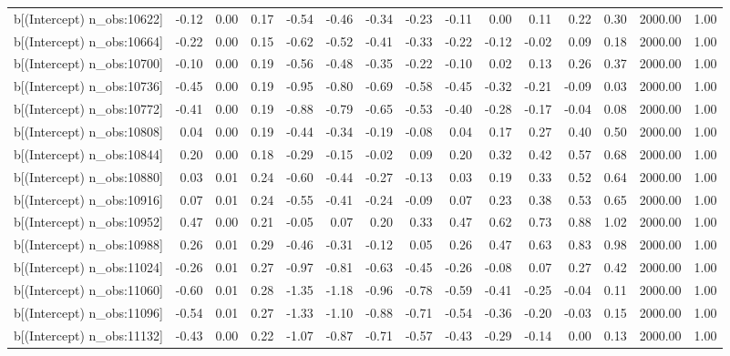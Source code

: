 \begin{table}[ht]
\begin{tabular}{rrrrrrrrrrrrrrr}
  b[(Intercept) n\_obs:10622] & -0.12 & 0.00 & 0.17 & -0.54 & -0.46 & -0.34 & -0.23 & -0.11 & 0.00 & 0.11 & 0.22 & 0.30 & 2000.00 & 1.00 \\ 
  b[(Intercept) n\_obs:10664] & -0.22 & 0.00 & 0.15 & -0.62 & -0.52 & -0.41 & -0.33 & -0.22 & -0.12 & -0.02 & 0.09 & 0.18 & 2000.00 & 1.00 \\ 
  b[(Intercept) n\_obs:10700] & -0.10 & 0.00 & 0.19 & -0.56 & -0.48 & -0.35 & -0.22 & -0.10 & 0.02 & 0.13 & 0.26 & 0.37 & 2000.00 & 1.00 \\ 
  b[(Intercept) n\_obs:10736] & -0.45 & 0.00 & 0.19 & -0.95 & -0.80 & -0.69 & -0.58 & -0.45 & -0.32 & -0.21 & -0.09 & 0.03 & 2000.00 & 1.00 \\ 
  b[(Intercept) n\_obs:10772] & -0.41 & 0.00 & 0.19 & -0.88 & -0.79 & -0.65 & -0.53 & -0.40 & -0.28 & -0.17 & -0.04 & 0.08 & 2000.00 & 1.00 \\ 
  b[(Intercept) n\_obs:10808] & 0.04 & 0.00 & 0.19 & -0.44 & -0.34 & -0.19 & -0.08 & 0.04 & 0.17 & 0.27 & 0.40 & 0.50 & 2000.00 & 1.00 \\ 
  b[(Intercept) n\_obs:10844] & 0.20 & 0.00 & 0.18 & -0.29 & -0.15 & -0.02 & 0.09 & 0.20 & 0.32 & 0.42 & 0.57 & 0.68 & 2000.00 & 1.00 \\ 
  b[(Intercept) n\_obs:10880] & 0.03 & 0.01 & 0.24 & -0.60 & -0.44 & -0.27 & -0.13 & 0.03 & 0.19 & 0.33 & 0.52 & 0.64 & 2000.00 & 1.00 \\ 
  b[(Intercept) n\_obs:10916] & 0.07 & 0.01 & 0.24 & -0.55 & -0.41 & -0.24 & -0.09 & 0.07 & 0.23 & 0.38 & 0.53 & 0.65 & 2000.00 & 1.00 \\ 
  b[(Intercept) n\_obs:10952] & 0.47 & 0.00 & 0.21 & -0.05 & 0.07 & 0.20 & 0.33 & 0.47 & 0.62 & 0.73 & 0.88 & 1.02 & 2000.00 & 1.00 \\ 
  b[(Intercept) n\_obs:10988] & 0.26 & 0.01 & 0.29 & -0.46 & -0.31 & -0.12 & 0.05 & 0.26 & 0.47 & 0.63 & 0.83 & 0.98 & 2000.00 & 1.00 \\ 
  b[(Intercept) n\_obs:11024] & -0.26 & 0.01 & 0.27 & -0.97 & -0.81 & -0.63 & -0.45 & -0.26 & -0.08 & 0.07 & 0.27 & 0.42 & 2000.00 & 1.00 \\ 
  b[(Intercept) n\_obs:11060] & -0.60 & 0.01 & 0.28 & -1.35 & -1.18 & -0.96 & -0.78 & -0.59 & -0.41 & -0.25 & -0.04 & 0.11 & 2000.00 & 1.00 \\ 
  b[(Intercept) n\_obs:11096] & -0.54 & 0.01 & 0.27 & -1.33 & -1.10 & -0.88 & -0.71 & -0.54 & -0.36 & -0.20 & -0.03 & 0.15 & 2000.00 & 1.00 \\ 
  b[(Intercept) n\_obs:11132] & -0.43 & 0.00 & 0.22 & -1.07 & -0.87 & -0.71 & -0.57 & -0.43 & -0.29 & -0.14 & 0.00 & 0.13 & 2000.00 & 1.00 \\ 

\end{tabular}
\end{table}

